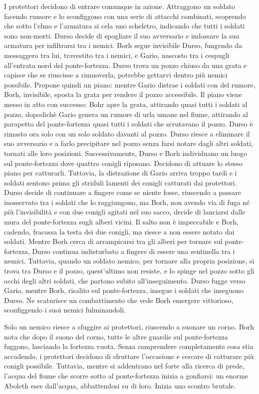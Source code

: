 I protettori decidono di entrare comunque in azione. Attraggono un
soldato facendo rumore e lo sconfiggono con una serie di attacchi
combinati, scoprendo che sotto l'elmo e l'armatura si cela uno
scheletro, indicando che tutti i soldati sono non-morti. Durso decide di
spogliare il suo avversario e indossare la sua armatura per infiltrarsi
tra i nemici. Borh segue invisibile Durso, fungendo da messaggero tra
lui, travestito tra i nemici, e Gario, nascosto tra i cespugli
all'entrata nord del ponte-fortezza. Durso trova un pozzo chiuso da una
grata e capisce che se riuscisse a rimuoverla, potrebbe gettarvi dentro
più nemici possibile. Propone quindi un piano: mentre Gario distrae i
soldati con del rumore, Borh, invisibile, sposta la grata per rendere il
pozzo accessibile. Il piano viene messo in atto con successo: Bohr apre
la grata, attirando quasi tutti i soldati al pozzo, dopodichè Gario
genera un rumore di urla umane nel fiume, attirando al parapetto del
ponte-fortezza quasi tutti i soldati che scrutavano il pozzo. Durso è
rimasto ora solo con un solo soldato davanti al pozzo. Durso riesce a
eliminare il suo avversario e a farlo precipitare nel pozzo senza farsi
notare dagli altri soldati, tornati alle loro posizioni.
Successivamente, Durso e Borh individuano un luogo sul ponte-fortezza
dove quattro conigli riposano. Decidono di attuare lo stesso piano per
catturarli. Tuttavia, la distrazione di Gario arriva troppo tardi e i
soldati sentono prima gli striduli lamenti dei conigli catturati dai
protettori. Durso decide di continuare a fingere come se niente fosse,
riuscendo a passare inosservato tra i soldati che lo raggiungono, ma
Borh, non avendo via di fuga né più l'invisibilità e con due conigli
agitati nel suo sacco, decide di lanciarsi dalle mura del ponte-fortezza
sugli alberi vicini. Il salto non è impeccabile e Borh, cadendo,
fracassa la testa dei due conigli, ma riesce a non essere notato dai
soldati. Mentre Borh cerca di arrampicarsi tra gli alberi per tornare
sul ponte-fortezza, Durso continua indisturbato a fingere di essere una
sentinella tra i nemici. Tuttavia, quando un soldato nemico, per tornare
alla propria posizione, si trova tra Durso e il pozzo, quest'ultimo non
resiste, e lo spinge nel pozzo sotto gli occhi degli altri soldati, che
partono subito all'inseguimento. Durso fugge verso Gario, mentre Borh,
risalito sul ponte-fortezza, insegue i soldati che inseguono Durso. Ne
scaturisce un combattimento che vede Borh emergere vittorioso,
sconfiggendo i suoi nemici fulminandoli.

Solo un nemico riesce a sfuggire ai protettori, riuscendo a suonare un
corno. Borh nota che dopo il suono del corno, tutte le altre guardie sul
ponte-fortezza fuggono, lasciando la fortezza vuota. Senza comprendere
completamente cosa stia accadendo, i protettori decidono di sfruttare
l'occasione e cercare di catturare più conigli possibile. Tuttavia,
mentre si addentrano nel forte alla ricerca di prede, l'acqua del fiume
che scorre sotto al ponte-fortezza inizia a gonfiarsi: un enorme Aboleth
esce dall'acqua, abbattendosi su di loro. Inizia uno scontro brutale.

